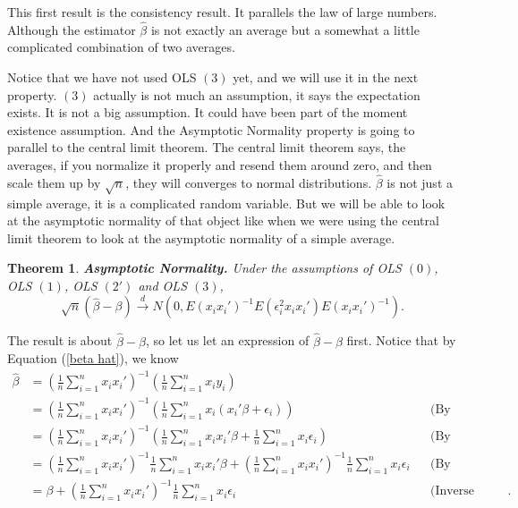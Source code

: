 \documentclass[11pt,a4paper]{amsart}
\theoremstyle{plain}
\newtheorem{theorem}{Theorem}
\theoremstyle{definition}
\begin{document}
 	This first result is the consistency result. It parallels the law of large numbers. Although the estimator $\hat{\beta}$ is not exactly an average but a somewhat a little complicated combination of two averages.\par 
 	Notice that we have not used OLS $(3)$ yet, and we will use it in the next property. $(3)$ actually is not much an assumption, it says the expectation exists. It is not a big assumption. It could have been part of the moment existence assumption. And the Asymptotic Normality property is going to parallel to the central limit theorem. The central limit theorem says, the averages, if you normalize it properly and resend them around zero, and then scale them up by $\sqrt{n}$, they will converges to normal distributions. $\hat{\beta}$ is not just a simple average, it is a complicated random variable. But we will be able to look at the asymptotic normality of that object like when we were using the central limit theorem to look at the asymptotic normality of a simple average. 
 	\begin{theorem}\label{asymptotic normality}
 		\textbf{Asymptotic Normality.} Under the assumptions of OLS $(0)$, OLS $(1)$, OLS $(2')$ and OLS $(3)$, 
 		\[	\sqrt{n}(\hat{\beta} - \beta) \stackrel{d}{\longrightarrow} N(0,E(x_{i}x_{i}')^{-1}E(\epsilon_{i}^{2}x_{i}x_{i}')E(x_{i}x_{i}')^{-1}).	\]
 	\end{theorem}
 	The result is about $\hat{\beta} - \beta$, so let us let an expression of $\hat{\beta} - \beta$ first. Notice that by Equation (\ref{beta hat}), we know 
 	\[\begin{aligned}
 		 \hat{\beta} &=  (\frac{1}{n}\sum_{i=1}^{n} x_{i}x_{i}')^{-1}(\frac{1}{n}\sum_{i=1}^{n}x_{i}y_{i}) \\
 		 &= (\frac{1}{n}\sum_{i=1}^{n} x_{i}x_{i}')^{-1}(\frac{1}{n}\sum_{i=1}^{n}x_{i}(x_{i}'\beta+\epsilon_{i}) ) &&\text{(By substitution)} \\
 		 &= (\frac{1}{n}\sum_{i=1}^{n} x_{i}x_{i}')^{-1}(\frac{1}{n}\sum_{i=1}^{n}x_{i}x_{i}'\beta+\frac{1}{n} \sum_{i=1}^{n} x_{i}\epsilon_{i} ) &&\text{(By distributivity)} \\
 		 &= (\frac{1}{n}\sum_{i=1}^{n} x_{i}x_{i}')^{-1} \frac{1}{n}\sum_{i=1}^{n}x_{i}x_{i}'\beta+ (\frac{1}{n}\sum_{i=1}^{n} x_{i}x_{i}')^{-1} \frac{1}{n}\sum_{i=1}^{n} x_{i}\epsilon_{i} &&\text{(By distributivity)} \\
 		  &= \beta+ (\frac{1}{n}\sum_{i=1}^{n} x_{i}x_{i}')^{-1} \frac{1}{n} \sum_{i=1}^{n} x_{i}\epsilon_{i} &&\text{(Inverse matrix got cancelled)}.
 	\end{aligned}\]
\end{document}
